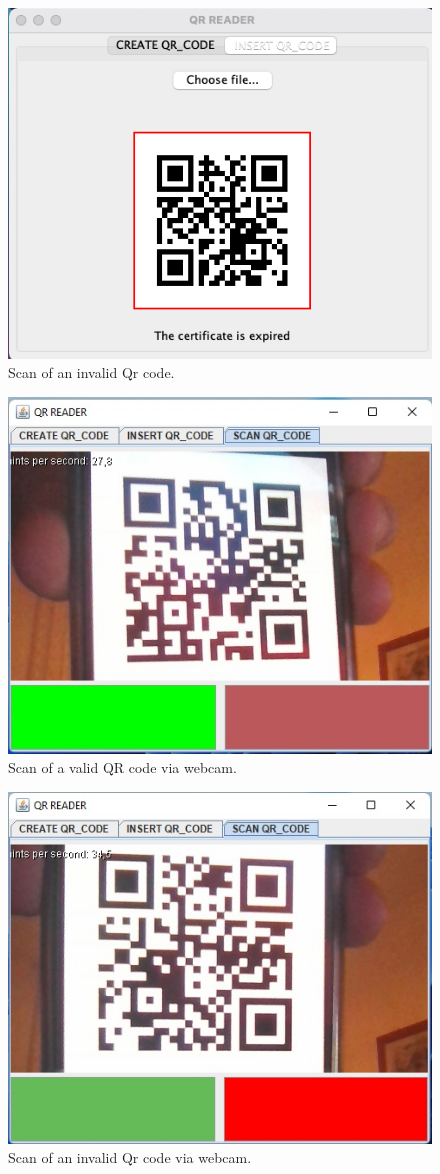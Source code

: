 \documentclass[12pt, a4paper]{article}
\begin{document}
\begin{figure}[ht]
    \centering
    \includegraphics[width=.6\linewidth]{app_4.png}
    \caption*{Scan of an invalid Qr code.} %
\end{figure}
\begin{figure}[ht]
    \centering
    \includegraphics[width=.6\linewidth]{app_5.png}
    \caption*{Scan of a valid QR code via webcam.} %
\end{figure}
\begin{figure}[ht]
    \centering
    \includegraphics[width=.6\linewidth]{app_6.png}
    \caption*{Scan of an invalid Qr code via webcam.} %
\end{figure}
\end{document}
